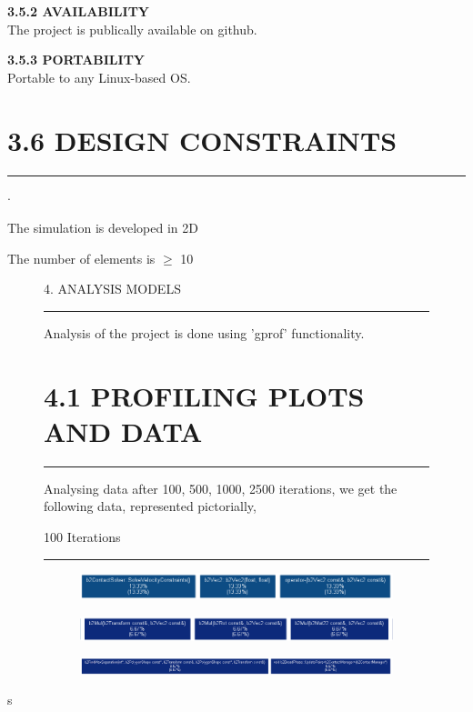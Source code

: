 \documentclass{report}
\begin{document}
\large \textbf{3.5.2 AVAILABILITY}\\
The project is publically available on github.

\large \textbf{3.5.3 PORTABILITY}\\
Portable to any Linux-based OS.

\section*{3.6 DESIGN CONSTRAINTS}
\hrule \large
\begin{list}{$\cdot$}{\setlength{\leftmargin}{0em}}
\item The simulation is developed in 2D
\item The number of elements is $\geq$ 10
\end{list}
\begin{figure}[b]
\huge 4. ANALYSIS MODELS \\
\hrule \large
Analysis of the project is done using 'gprof' \cite{gprof} functionality. 
\section*{4.1 PROFILING PLOTS AND DATA \\}
\hrule
\large Analysing data after 100, 500, 1000, 2500 iterations, we get the following data, represented pictorially,

\Large \begin{center}100 Iterations \hrule \end{center}
\begin{subfigure}[h]{\textwidth}
\includegraphics[width=\textwidth, height=0.1\textwidth]{gprof/100_1.png}
\caption{}
\end{subfigure}
\begin{subfigure}[h]{\textwidth}
\includegraphics[width=\textwidth, height=0.1\textwidth]{gprof/100_2.png}
\caption{}
\end{subfigure}
\begin{subfigure}[h]{\textwidth}
\includegraphics[width=\textwidth, height=0.1\textwidth]{gprof/100_3.png}
\caption{}
\end{subfigure}
\end{figure}s
\end{document}
